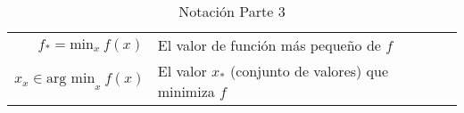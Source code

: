\begin{table}[H]
\begin{center}
\begin{tabularx}{\textwidth}{|r|X|}
            $ f_{*} = \text{min}_x~f(x) $                                                                                                                                                                                                     & El valor de función más pequeño de $f$                                                                \\
            $ {x}_x \in \text{arg min}_{x}~f(x) $                                                                                                                                                                                             & El valor $x_{*}$ (conjunto de valores) que minimiza $f$                                               \\
            \hline
        \end{tabularx}
        \caption{Notación Parte 3}
        \label{tab:nnotation-part-3}
    \end{center}
\end{table}


